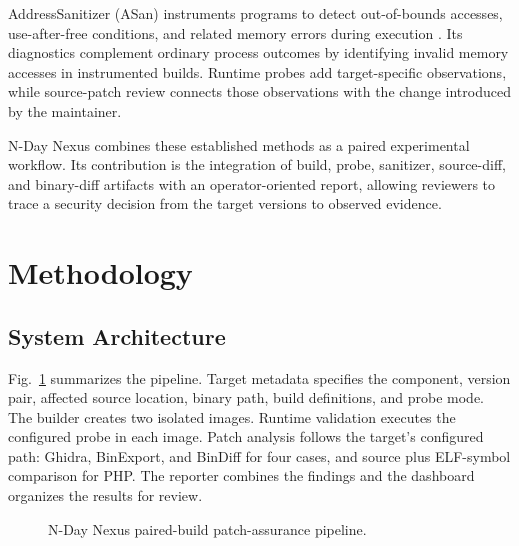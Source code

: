 \documentclass[conference]{IEEEtran}
\newcommand{\tool}{N-Day Nexus}
\begin{document}
AddressSanitizer (ASan) instruments programs to detect out-of-bounds accesses, use-after-free conditions, and related memory errors during execution \cite{asan}. Its diagnostics complement ordinary process outcomes by identifying invalid memory accesses in instrumented builds. Runtime probes add target-specific observations, while source-patch review connects those observations with the change introduced by the maintainer.

\tool{} combines these established methods as a paired experimental workflow. Its contribution is the integration of build, probe, sanitizer, source-diff, and binary-diff artifacts with an operator-oriented report, allowing reviewers to trace a security decision from the target versions to observed evidence.

\section{Methodology}
\subsection{System Architecture}
Fig.~\ref{fig:architecture} summarizes the pipeline. Target metadata specifies the component, version pair, affected source location, binary path, build definitions, and probe mode. The builder creates two isolated images. Runtime validation executes the configured probe in each image. Patch analysis follows the target's configured path: Ghidra, BinExport, and BinDiff for four cases, and source plus ELF-symbol comparison for PHP. The reporter combines the findings and the dashboard organizes the results for review.

\begin{figure}[t]
\centering
{}
\caption{N-Day Nexus paired-build patch-assurance pipeline.}
\label{fig:architecture}
\end{figure}
\end{document}
